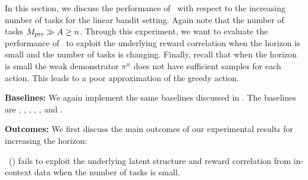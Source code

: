 In this section, we discuss the performance of \pred\ with respect to the increasing number of tasks for the linear bandit setting. Again note that the number of tasks $M_{\text{pre}} \gg A \geq n$.
% 
%
Through this experiment, we want to evaluate the performance of \pred\ to exploit the underlying reward correlation when the horizon is small and the number of tasks is changing.
%
Finally, recall that when the horizon is small the weak demonstrator $\pi^w$ does not have sufficient samples for each action. This leads to a poor approximation of the greedy action. 


\textbf{Baselines:} We again implement the same baselines discussed in . The baselines are \pred, \predt, \dptg, \ad, \ts, and \linucb. 


\textbf{Outcomes:} We first discuss the main outcomes of our experimental results for increasing the horizon:

\begin{tcolorbox}
\customfinding \pred\ (\gt) fails to exploit the underlying latent structure and reward correlation from in-context data when the number of tasks is small. 
\end{tcolorbox}







